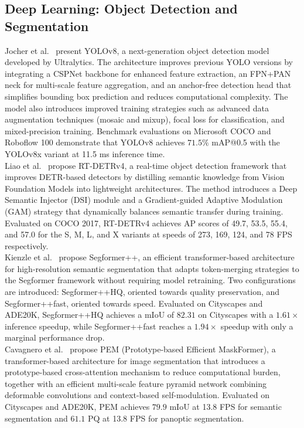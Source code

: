 \documentclass[11pt]{article}
\begin{document}
\subsection{Deep Learning: Object Detection and Segmentation}

Jocher et al.~\cite{Jocher2023YOLOv8} present YOLOv8, a next-generation object
detection model developed by Ultralytics. The architecture improves previous YOLO
versions by integrating a CSPNet backbone for enhanced feature extraction, an
FPN+PAN neck for multi-scale feature aggregation, and an anchor-free detection
head that simplifies bounding box prediction and reduces computational complexity.
The model also introduces improved training strategies such as advanced data
augmentation techniques (mosaic and mixup), focal loss for classification, and
mixed-precision training. Benchmark evaluations on Microsoft COCO and Roboflow
100 demonstrate that YOLOv8 achieves $71.5\%$ mAP@0.5 with the YOLOv8x variant
at 11.5 ms inference time.\\

Liao et al.~\cite{LiaoRTDETRv4} propose RT-DETRv4, a real-time object detection
framework that improves DETR-based detectors by distilling semantic knowledge from
Vision Foundation Models into lightweight architectures. The method introduces a
Deep Semantic Injector (DSI) module and a Gradient-guided Adaptive Modulation
(GAM) strategy that dynamically balances semantic transfer during training.
Evaluated on COCO 2017, RT-DETRv4 achieves AP scores of 49.7, 53.5, 55.4, and
57.0 for the S, M, L, and X variants at speeds of 273, 169, 124, and 78 FPS
respectively.\\

Kienzle et al.~\cite{KienzleSegformer2024} propose Segformer++, an efficient
transformer-based architecture for high-resolution semantic segmentation that
adapts token-merging strategies to the Segformer framework without requiring model
retraining. Two configurations are introduced: Segformer++HQ, oriented towards
quality preservation, and Segformer++fast, oriented towards speed. Evaluated on
Cityscapes and ADE20K, Segformer++HQ achieves a mIoU of $82.31$ on Cityscapes
with a $1.61\times$ inference speedup, while Segformer++fast reaches a
$1.94\times$ speedup with only a marginal performance drop.\\

Cavagnero et al.~\cite{CavagneroPEM2024} propose PEM (Prototype-based Efficient
MaskFormer), a transformer-based architecture for image segmentation that
introduces a prototype-based cross-attention mechanism to reduce computational
burden, together with an efficient multi-scale feature pyramid network combining
deformable convolutions and context-based self-modulation. Evaluated on
Cityscapes and ADE20K, PEM achieves $79.9$ mIoU at 13.8 FPS for semantic
segmentation and $61.1$ PQ at 13.8 FPS for panoptic segmentation.\\
\end{document}
